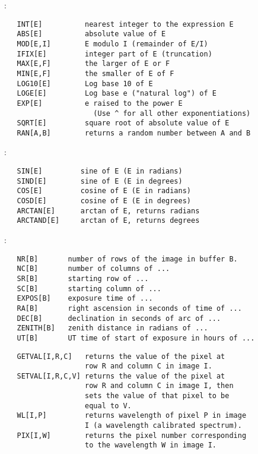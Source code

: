 \noindent {}:
\begin{verbatim}
   INT[E]          nearest integer to the expression E
   ABS[E]          absolute value of E
   MOD[E,I]        E modulo I (remainder of E/I)
   IFIX[E]         integer part of E (truncation)
   MAX[E,F]        the larger of E or F
   MIN[E,F]        the smaller of E of F
   LOG10[E]        Log base 10 of E
   LOGE[E]         Log base e ("natural log") of E
   EXP[E]          e raised to the power E
                     (Use ^ for all other exponentiations)
   SQRT[E]         square root of absolute value of E
   RAN[A,B]        returns a random number between A and B
\end{verbatim}

\noindent {}:
\begin{verbatim}
   SIN[E]         sine of E (E in radians)
   SIND[E]        sine of E (E in degrees)
   COS[E]         cosine of E (E in radians)
   COSD[E]        cosine of E (E in degrees)
   ARCTAN[E]      arctan of E, returns radians
   ARCTAND[E]     arctan of E, returns degrees
\end{verbatim}

\noindent {}:
\begin{verbatim}
   NR[B]       number of rows of the image in buffer B.
   NC[B]       number of columns of ...
   SR[B]       starting row of ...
   SC[B]       starting column of ...
   EXPOS[B]    exposure time of ...
   RA[B]       right ascension in seconds of time of ...
   DEC[B]      declination in seconds of arc of ...
   ZENITH[B]   zenith distance in radians of ...
   UT[B]       UT time of start of exposure in hours of ...
\end{verbatim}

\noindent {}
\begin{verbatim}
   GETVAL[I,R,C]   returns the value of the pixel at
                   row R and column C in image I.
   SETVAL[I,R,C,V] returns the value of the pixel at
                   row R and column C in image I, then
                   sets the value of that pixel to be
                   equal to V.
   WL[I,P]         returns wavelength of pixel P in image
                   I (a wavelength calibrated spectrum).
   PIX[I,W]        returns the pixel number corresponding
                   to the wavelength W in image I.
\end{verbatim}

